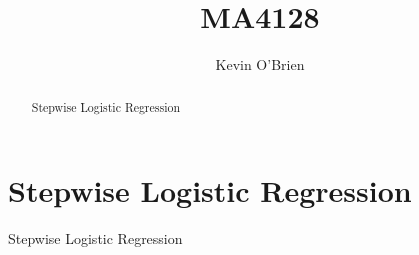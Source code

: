 \documentclass[12pt]{article}
\title{MA4128}
\author{Kevin O'Brien}
\begin{document}
\maketitle

\begin{abstract}
Stepwise Logistic Regression
\end{abstract}

\section{Stepwise Logistic Regression}
Stepwise Logistic Regression
\end{document}
